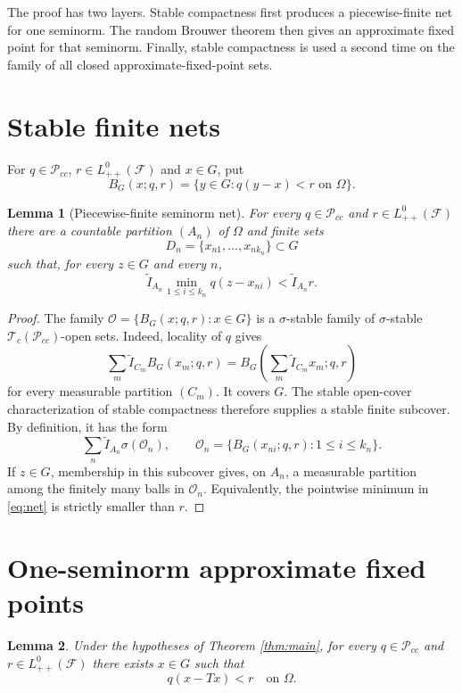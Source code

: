 \documentclass[11pt]{article}
\newtheorem{lemma}{Lemma}
\newcommand{\Lzpp}{L^0_{++}(\mathcal F)}
\newcommand{\Tc}{\mathcal T_c}
\newcommand{\Pcc}{\mathcal P_{cc}}
\newcommand{\ind}{\widetilde I}
\begin{document}
The proof has two layers.  Stable compactness first produces a
piecewise-finite net for one seminorm.  The random Brouwer theorem then
gives an approximate fixed point for that seminorm.  Finally, stable
compactness is used a second time on the family of all closed
approximate-fixed-point sets.

\section*{Stable finite nets}

For $q\in\Pcc$, $r\in\Lzpp$ and $x\in G$, put
\[
 B_G(x;q,r)=\{y\in G:q(y-x)<r\text{ on }\Omega\}.
\]

\begin{lemma}[Piecewise-finite seminorm net]\label{lem:net}
For every $q\in\Pcc$ and $r\in\Lzpp$ there are a countable partition
$(A_n)$ of $\Omega$ and finite sets
\[
 D_n=\{x_{n1},\ldots,x_{nk_n}\}\subset G
\]
such that, for every $z\in G$ and every $n$,
\begin{equation}\label{eq:net}
 \ind_{A_n}\min_{1\le i\le k_n}q(z-x_{ni})
 <\ind_{A_n}r.
\end{equation}
\end{lemma}

\begin{proof}
The family
$\mathscr O=\{B_G(x;q,r):x\in G\}$ is a $\sigma$-stable family of
$\sigma$-stable $\Tc(\Pcc)$-open sets.  Indeed, locality of $q$ gives
\[
 \sum_m\ind_{C_m}B_G(x_m;q,r)
 =B_G\!\left(\sum_m\ind_{C_m}x_m;q,r\right)
\]
for every measurable partition $(C_m)$.  It covers $G$.  The stable
open-cover characterization of stable compactness therefore supplies a
stable finite subcover.  By definition, it has the form
\[
 \sum_n\ind_{A_n}\sigma(\mathscr O_n),
 \qquad
 \mathscr O_n=\{B_G(x_{ni};q,r):1\le i\le k_n\}.
\]
If $z\in G$, membership in this subcover gives, on $A_n$, a measurable
partition among the finitely many balls in $\mathscr O_n$.  Equivalently,
the pointwise minimum in \eqref{eq:net} is strictly smaller than $r$.
\end{proof}

\section*{One-seminorm approximate fixed points}

\begin{lemma}\label{lem:approx}
Under the hypotheses of Theorem \ref{thm:main}, for every $q\in\Pcc$ and
$r\in\Lzpp$ there exists $x\in G$ such that
\begin{equation}\label{eq:approx}
 q(x-Tx)<r\quad\text{on }\Omega.
\end{equation}
\end{lemma}
\end{document}

